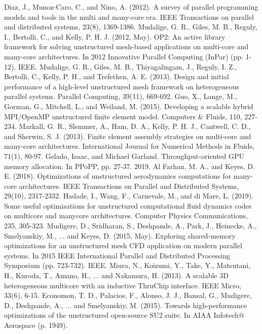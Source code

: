 \documentclass[5p,times]{elsarticle}
\begin{document}
\begin{thebibliography}{00}


 Diaz, J., Munoz-Caro, C., and Nino, A. (2012). A survey of parallel programming models and tools in the multi and many-core era. IEEE Transactions on parallel and distributed systems, 23(8), 1369-1386.
 Mudalige, G. R., Giles, M. B., Reguly, I., Bertolli, C., and Kelly, P. H. J. (2012, May). OP2: An active library framework for solving unstructured mesh-based applications on multi-core and many-core architectures. In 2012 Innovative Parallel Computing (InPar) (pp. 1-12). IEEE.
 Mudalige, G. R., Giles, M. B., Thiyagalingam, J., Reguly, I. Z., Bertolli, C., Kelly, P. H., and Trefethen, A. E. (2013). Design and initial performance of a high-level unstructured mesh framework on heterogeneous parallel systems. Parallel Computing, 39(11), 669-692.
 Guo, X., Lange, M., Gorman, G., Mitchell, L., and Weiland, M. (2015). Developing a scalable hybrid MPI/OpenMP unstructured finite element model. Computers \& Fluids, 110, 227-234.
 Markall, G. R., Slemmer, A., Ham, D. A., Kelly, P. H. J., Cantwell, C. D., and Sherwin, S. J. (2013). Finite element assembly strategies on multi‐core and many‐core architectures. International Journal for Numerical Methods in Fluids, 71(1), 80-97.
 Gelado, Isaac, and Michael Garland. Throughput-oriented GPU memory allocation. In PPoPP, pp. 27-37. 2019.
 Al Farhan, M. A., and Keyes, D. E. (2018). Optimizations of unstructured aerodynamics computations for many-core architectures. IEEE Transactions on Parallel and Distributed Systems, 29(10), 2317-2332.
 Hadade, I., Wang, F., Carnevale, M., and di Mare, L. (2019). Some useful optimisations for unstructured computational fluid dynamics codes on multicore and manycore architectures. Computer Physics Communications, 235, 305-323.
 Mudigere, D., Sridharan, S., Deshpande, A., Park, J., Heinecke, A., Smelyanskiy, M., ... and Keyes, D. (2015, May). Exploring shared-memory optimizations for an unstructured mesh CFD application on modern parallel systems. In 2015 IEEE International Parallel and Distributed Processing Symposium (pp. 723-732). IEEE.
 Miura, N., Koizumi, Y., Take, Y., Matsutani, H., Kuroda, T., Amano, H., ... and Nakamura, H. (2013). A scalable 3D heterogeneous multicore with an inductive ThruChip interface. IEEE Micro, 33(6), 6-15.
 Economon, T. D., Palacios, F., Alonso, J. J., Bansal, G., Mudigere, D., Deshpande, A., ... and Smelyanskiy, M. (2015). Towards high-performance optimizations of the unstructured open-source SU2 suite. In AIAA Infotech@ Aerospace (p. 1949).

\end{thebibliography}
\end{document}
